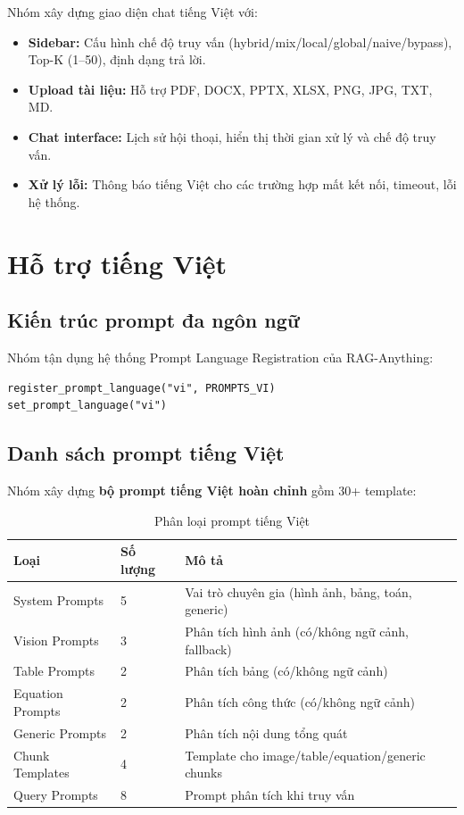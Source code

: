 \documentclass[12pt,a4paper]{article}
\begin{document}
Nhóm xây dựng giao diện chat tiếng Việt với:

\begin{itemize}
  \item \textbf{Sidebar:} Cấu hình chế độ truy vấn (hybrid/mix/local/global/naive/bypass), Top-K (1--50), định dạng trả lời.
  \item \textbf{Upload tài liệu:} Hỗ trợ PDF, DOCX, PPTX, XLSX, PNG, JPG, TXT, MD.
  \item \textbf{Chat interface:} Lịch sử hội thoại, hiển thị thời gian xử lý và chế độ truy vấn.
  \item \textbf{Xử lý lỗi:} Thông báo tiếng Việt cho các trường hợp mất kết nối, timeout, lỗi hệ thống.
\end{itemize}

\section{Hỗ trợ tiếng Việt}

\subsection{Kiến trúc prompt đa ngôn ngữ}

Nhóm tận dụng hệ thống Prompt Language Registration của RAG-Anything:

\begin{lstlisting}[language=pseudo]
register_prompt_language("vi", PROMPTS_VI)
set_prompt_language("vi")
\end{lstlisting}

\subsection{Danh sách prompt tiếng Việt}

Nhóm xây dựng \textbf{bộ prompt tiếng Việt hoàn chỉnh} gồm 30+ template:

\begin{table}[H]
\centering
\caption{Phân loại prompt tiếng Việt}
\begin{tabular}{p{3.5cm}p{3.5cm}p{6cm}}
\toprule
\textbf{Loại} & \textbf{Số lượng} & \textbf{Mô tả} \\
\midrule
System Prompts & 5 & Vai trò chuyên gia (hình ảnh, bảng, toán, generic) \\
Vision Prompts & 3 & Phân tích hình ảnh (có/không ngữ cảnh, fallback) \\
Table Prompts & 2 & Phân tích bảng (có/không ngữ cảnh) \\
Equation Prompts & 2 & Phân tích công thức (có/không ngữ cảnh) \\
Generic Prompts & 2 & Phân tích nội dung tổng quát \\
Chunk Templates & 4 & Template cho image/table/equation/generic chunks \\
Query Prompts & 8 & Prompt phân tích khi truy vấn \\
\bottomrule
\end{tabular}
\end{table}
\end{document}
